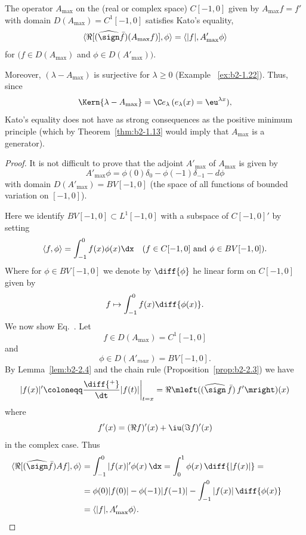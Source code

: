 \begin{example}\label{ex:b2-2.12}
The operator $A_{\max}$ on the (real or complex space) $C[-1,0]$ given by $A_{\max}f = f'$ with domain $D(A_{\max}) = C^{1}[-1,0]$ satisfies Kato's equality, \ie 
\begin{equation}\label{eq:b2-2.16}
\langle \Re[(\widehat{\sign} \bar{f})(A_{\max}f)],\phi \rangle = \langle |f|,A'_{\max}\phi \rangle
\end{equation}
for $(f \in D(A_{\max})$ and $ \phi \in D(A'_{\max}))$.

Moreover, $(\lambda - A_{\max})$ is surjective for $\lambda \geq 0$ (\cf Example ~\ref{ex:b2-1.22}).
Thus, since 
\[
	\Kern{\lambda - A_{\max}} = \C e_{\lambda} \, (e_{\lambda}(x) = \eu^{\lambda x}), 
\]
Kato's equality does not have as strong consequences as the positive minimum principle (which by Theorem~\ref{thm:b2-1.13} would imply that $A_{\max}$ is a generator).
\end{example}
\begin{proof}
It is not difficult to prove that the adjoint $A'_{\max}$ of\/ $A_{\max}$ is given by
\begin{equation}\label{eq:b2-2.17}
A'_{\max}\phi = \phi(0)\delta_{0} - \phi(-1)\delta_{-1} - d\phi
\end{equation}
with domain $D(A'_{\max}) = BV[-1,0]$ (the space of all functions of bounded variation on $[-1,0]$).

Here we identify $BV[-1,0] \subset L^{1}[-1,0]$ with a subspace of\/ $C[-1,0]'$ by setting 
%
\[
	\langle f,\phi \rangle = \int_{-1}^{0} f(x) \phi(x) \dx 
	\quad (f \in C[-1,0] \text{ and } \phi \in BV[-1,0]) .
\]
%
Where for $\phi \in BV[-1,0]$ we denote by $\diff{\phi}$ he linear form on $C[-1,0]$ given by 
%
\[
	f \mapsto \int_{-1}^{0} f(x)  \diff{\phi(x)} .
\]
%
We now show Eq.~.
Let 
%
\[
	f \in D(A_{\max}) = C^{1}[-1,0] 
\]
%
and 
%
\[
	\phi \in D(A'_{max}) =  BV[-1,0] .
\]
%
By Lemma~\ref{lem:b2-2.4} and the chain rule (Proposition~\ref{prop:b2-2.3}) we have
\[
|f(x)|' \coloneqq \frac{\diff{^{+}}}{\dt} |f(t)| \bigg|_{t=x}
= \Re \mleft( ( \widehat{\sign}\, \bar{f} ) \, f' \mright)(x)
\]
where
%
\[
	  f'(x) = (\Re f)'(x) + \iu (\Im f)'(x)  
\]
%
in the complex case.
Thus
\begin{align*}
\langle \Re[(\widehat{\sign} \bar{f})Af],\phi \rangle &= \int_{-1}^{0} |f(x)|'\phi(x)\, \dx = \int_{0}^{1} \phi(x)\, \diff{|f(x)|} = \\
&= \phi(0)|f(0)| - \phi(-1)|f(-1)| - \int_{-1}^{0} |f(x)|\,\diff{\phi(x)}  \\
&= \langle |f|,A'_{\max}\phi \rangle.
&&\qedhere
\end{align*}
\end{proof}
